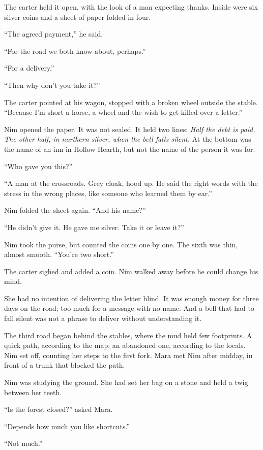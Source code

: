 \documentclass[10pt,a4paper]{article}
\begin{document}
The carter held it open, with the look of a man expecting thanks. Inside were six silver coins and a sheet of paper folded in four.

“The agreed payment,” he said.

“For the road we both know about, perhaps.”

“For a delivery.”

“Then why don't you take it?”

The carter pointed at his wagon, stopped with a broken wheel outside the stable. “Because I'm short a horse, a wheel and the wish to get killed over a letter.”

Nim opened the paper. It was not sealed. It held two lines: \emph{Half the debt is paid. The other half, in northern silver, when the bell falls silent.} At the bottom was the name of an inn in Hollow Hearth, but not the name of the person it was for.

“Who gave you this?”

“A man at the crossroads. Grey cloak, hood up. He said the right words with the stress in the wrong places, like someone who learned them by ear.”

Nim folded the sheet again. “And his name?”

“He didn't give it. He gave me silver. Take it or leave it?”

Nim took the purse, but counted the coins one by one. The sixth was thin, almost smooth. “You're two short.”

The carter sighed and added a coin. Nim walked away before he could change his mind.

She had no intention of delivering the letter blind. It was enough money for three days on the road; too much for a message with no name. And a bell that had to fall silent was not a phrase to deliver without understanding it.

The third road began behind the stables, where the mud held few footprints. A quick path, according to the map; an abandoned one, according to the locals. Nim set off, counting her steps to the first fork.
Mara met Nim after midday, in front of a trunk that blocked the path.

Nim was studying the ground. She had set her bag on a stone and held a twig between her teeth.

“Is the forest closed?” asked Mara.

“Depends how much you like shortcuts.”

“Not much.”
\end{document}
